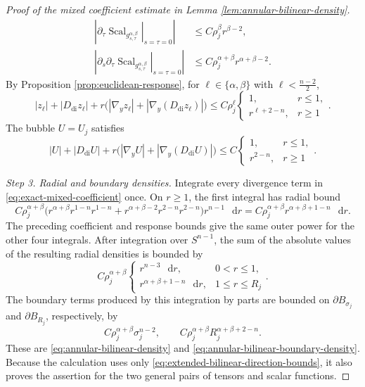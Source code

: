 \documentclass[11pt]{article}
\numberwithin{equation}{section}
\theoremstyle{remark}
\newcommand{\Sph}{S}
\newcommand{\dd}{\mathop{}\!\mathrm{d}}
\begin{document}
\begin{proof}[Proof of the mixed coefficient estimate in
Lemma  \ref{lem:annular-bilinear-density}]
{\[\begin{aligned}
 \left|\left.\partial_\tau \operatorname{Scal}_{g_{s,\tau}^{\alpha,\beta}}
 \right|_{s=\tau=0}\right|
 &\le C\rho_j^\beta r^{\beta-2},\\
 \left|\left.\partial_s\partial_\tau \operatorname{Scal}_{g_{s,\tau}^{\alpha,\beta}}
 \right|_{s=\tau=0}\right|
 &\le C\rho_j^{\alpha+\beta}r^{\alpha+\beta-2}.
\end{aligned}
\]
}
{By Proposition  \ref{prop:euclidean-response}, for
\(\ell\in\{\alpha,\beta\}\) with \(\ell<\frac{n-2}{2}\),
\[
 |z_\ell|+|D_{\mathrm{di}}z_\ell|
 +r\bigl(|\nabla_yz_\ell|
 +|\nabla_y(D_{\mathrm{di}}z_\ell)|\bigr)
 \le C\rho_j^\ell
 \begin{cases}
  1,&r\le1,\\
  r^{\ell+2-n},&r\ge1
 \end{cases}.
\]
}
{The bubble \(U=U_j\) satisfies
\[
 |U|+|D_{\mathrm{di}}U|
 +r\bigl(|\nabla_yU|
 +|\nabla_y(D_{\mathrm{di}}U)|\bigr)
 \le C
 \begin{cases}
  1,&r\le1,\\
  r^{2-n},&r\ge1
\end{cases}.
\]
}

\emph{Step 3. Radial and boundary densities.}
Integrate every divergence term in
\eqref{eq:exact-mixed-coefficient} once. On \(r\ge1\), the first
integral has radial bound
\[
 C\rho_j^{\alpha+\beta}
 \bigl(r^{\alpha+\beta}r^{1-n}r^{1-n}
      +r^{\alpha+\beta-2}r^{2-n}r^{2-n}\bigr)
 r^{n-1}\,\dd r
 =C\rho_j^{\alpha+\beta}r^{\alpha+\beta+1-n}\,\dd r.
\]
{The preceding coefficient and response bounds give the same
outer power for the other four integrals.} After integration over
\(\Sph^{n-1}\), the sum of the absolute
values of the resulting radial densities is bounded by
\[
 C\rho_j^{\alpha+\beta}
 \begin{cases}
  r^{n-3}\,\dd r,&0<r\le1,\\
  r^{\alpha+\beta+1-n}\,\dd r,&1\le r\le R_j
 \end{cases}.
\]
{The boundary terms produced by this integration by parts are
bounded on \(\partial B_{\sigma_j}\) and \(\partial B_{R_j}\), respectively,
by}
\[
 C\rho_j^{\alpha+\beta}\sigma_j^{n-2},
 \qquad
 C\rho_j^{\alpha+\beta}R_j^{\alpha+\beta+2-n}.
\]
These are \eqref{eq:annular-bilinear-density} and
\eqref{eq:annular-bilinear-boundary-density}. {Because the
calculation uses only \eqref{eq:extended-bilinear-direction-bounds}, it also
proves the assertion for the two general pairs of tensors
and scalar functions.}
\end{proof}
\end{document}

